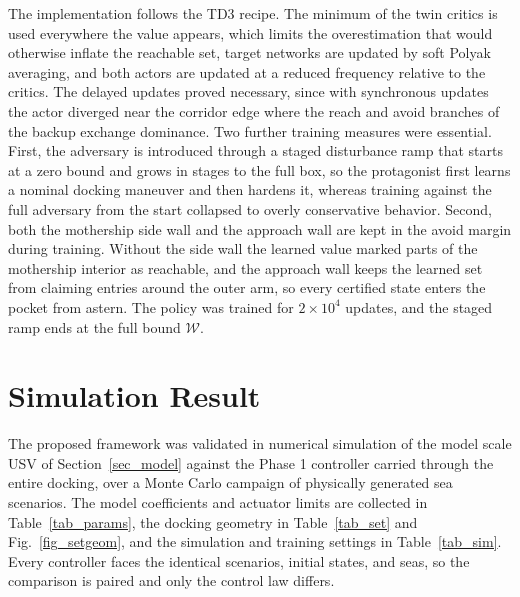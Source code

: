 \documentclass[5p,times,authoryear]{elsarticle}
\begin{document}
The implementation follows the TD3 recipe. The minimum of the twin critics is used everywhere the value appears, which limits the overestimation that would otherwise inflate the reachable set, target networks are updated by soft Polyak averaging, and both actors are updated at a reduced frequency relative to the critics. The delayed updates proved necessary, since with synchronous updates the actor diverged near the corridor edge where the reach and avoid branches of the backup exchange dominance. Two further training measures were essential. First, the adversary is introduced through a staged disturbance ramp that starts at a zero bound and grows in stages to the full box, so the protagonist first learns a nominal docking maneuver and then hardens it, whereas training against the full adversary from the start collapsed to overly conservative behavior. Second, both the mothership side wall and the approach wall are kept in the avoid margin during training. Without the side wall the learned value marked parts of the mothership interior as reachable, and the approach wall keeps the learned set from claiming entries around the outer arm, so every certified state enters the pocket from astern. The policy was trained for $2\times10^{4}$ updates, and the staged ramp ends at the full bound $\mathcal{W}$.



\section{Simulation Result}\label{sec_results}

The proposed framework was validated in numerical simulation of the model scale USV of Section~\ref{sec_model} against the Phase 1 controller carried through the entire docking, over a Monte Carlo campaign of physically generated sea scenarios. The model coefficients and actuator limits are collected in Table~\ref{tab_params}, the docking geometry in Table~\ref{tab_set} and Fig.~\ref{fig_setgeom}, and the simulation and training settings in Table~\ref{tab_sim}. Every controller faces the identical scenarios, initial states, and seas, so the comparison is paired and only the control law differs.
\end{document}
